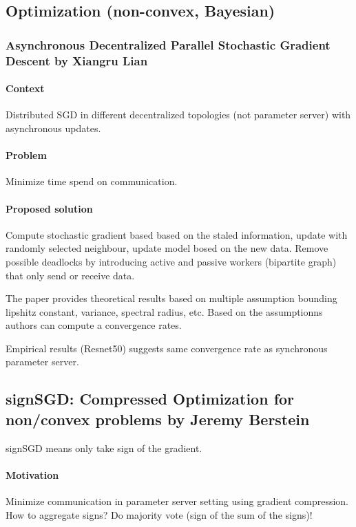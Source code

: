 \documentclass[11pt,oneside,a4paper]{scrartcl}
\begin{document}
\subsection{Optimization (non-convex, Bayesian)}
\label{sec:optim-non-conv}

\subsubsection{Asynchronous Decentralized Parallel Stochastic Gradient
  Descent by Xiangru Lian \cite{lian18a}}
\label{sec:asynchr-decentr-para}

\paragraph{Context}
 Distributed SGD in different decentralized topologies (not
parameter server) with asynchronous updates. 

\paragraph{Problem}
Minimize time spend on communication.

\paragraph{Proposed solution}
Compute stochastic gradient based based on the staled information,
update with randomly selected neighbour, update model bosed on the new
data. Remove possible deadlocks by introducing active and passive
workers (bipartite graph) that only send or receive data.

The paper provides theoretical
results based on multiple assumption bounding lipshitz constant,
variance, spectral radius, etc. Based on the assumptionns authors can
compute a convergence rates.

Empirical results (Resnet50) suggests same convergence rate as
synchronous parameter server.



\subsection{signSGD: Compressed Optimization for non/convex problems
by Jeremy Berstein  \cite{bernstein18a}}
\label{sec:signsgd:-compr-optim}

signSGD means only take sign of the gradient.

\paragraph{Motivation}
Minimize communication in parameter server setting using gradient
compression. How to aggregate signs? Do majority vote (sign of the sum
of the signs)!
\end{document}
